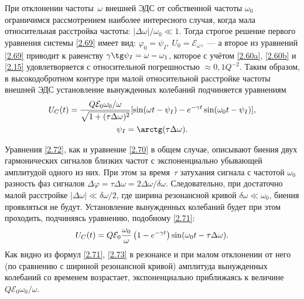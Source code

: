 При отклонении частоты~$\omega$ внешней ЭДС от собственной частоты $\omega_0$
ограничимся рассмотрением наиболее интересного случая, когда
мала относительная расстройка частоты: $|\Delta\omega|/\omega_0\ll 1$. 
Тогда строгое решение первого
уравнения системы \eqref{2.69} имеет вид:
$\varphi_0=\psi_I,~U_0 =\mathcal{E}_{\omega}$,~--- а второе из уравнений
\eqref{2.69} приводит к равенству $\gamma\tg\psi_I=\omega-\omega_1$, которое с
учётом \eqref{2.60a}, \eqref{2.60b} и \eqref{2.15} удовлетворяется с относительной погрешностью
$\approx0,1Q^{-2}$. Таким образом, в высокодобротном контуре при малой
относительной расстройке частоты внешней ЭДС установление вынужденных колебаний
подчиняется уравнениям
\begin{equation}
	\eqmark{2.72}
	\begin{gathered}[c]
U_C(t)=\dfrac{Q\mathcal{E}_0\omega_0/\omega}{\sqrt{1+(\tau\Delta\omega)^2}}[
\sin(\omega t-\psi_I)-e^{-\gamma t}\sin(\omega_0t-\psi_I)],\\
		\psi_I=\arctg(\tau\Delta\omega).
	\end{gathered}
\end{equation}

Уравнения \eqref{2.72}, как и уравнение \eqref{2.70} в общем случае, описывают
биения двух гармонических сигналов близких частот с экспоненциально убывающей
амплитудой одного из них. При этом за время~$\tau$ затухания сигнала с частотой
$\omega_0$ разность фаз сигналов
$\Delta\varphi=\tau\Delta\omega=2\Delta\omega/\delta\omega$. Следовательно, при
достаточно малой расстройке
$|\Delta\omega|\ll\delta\omega/2$,
где ширина резонансной кривой 
$\delta\omega \ll \omega_0$, 
биения проявляться не будут. 
Установление вынужденных колебаний будет при этом проходить,
подчиняясь уравнению, подобному \eqref{2.71}:
\begin{equation}\eqmark{2.73}
	U_C(t)=Q\mathcal{E}_0\frac{\omega_0}{\omega}\left(1-e^{-\gamma
t}\right)\sin(\omega_0t-\tau\Delta\omega).
\end{equation}
Как видно из формул \eqref{2.71}, \eqref{2.73} в резонансе и при малом
отклонении от него (по сравнению с шириной резонансной кривой) амплитуда
вынужденных колебаний со временем возрастает, экспоненциально приближаясь 
к величине $Q\mathcal{E}_0\omega_0/\omega$.

